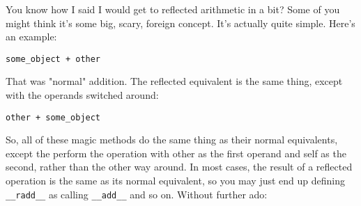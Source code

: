 \documentclass[a4paper,11pt]{article}
\newcommand{\code}[1]{\texttt{#1}}
\begin{document}
You know how I said I would get to reflected arithmetic in a bit? Some of you might think it's some big, scary, foreign concept. It's actually quite simple. Here's an example:

\begin{lstlisting}
some_object + other
\end{lstlisting}

\noindent
That was "normal" addition. The reflected equivalent is the same thing, except with the operands switched around:

\begin{lstlisting}
other + some_object
\end{lstlisting}

\noindent
So, all of these magic methods do the same thing as their normal equivalents, except the perform the operation with other as the first operand and self as the second, rather than the other way around. In most cases, the result of a reflected operation is the same as its normal equivalent, so you may just end up defining \code{__radd__} as calling \code{__add__} and so on. Without further ado:
\end{document}
